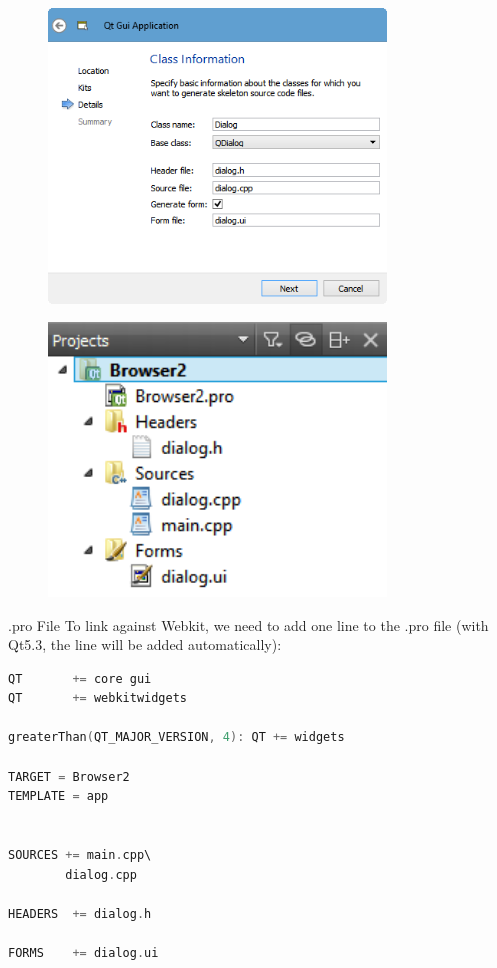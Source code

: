 \begin{figure}[htbp]
\centering
\includegraphics[width=0.8\textwidth]{images/QDialog.png}
\caption{}
\end{figure}

\begin{figure}[htbp]
\centering
\includegraphics[width=0.8\textwidth]{images/Browser2_Files.png}
\caption{}
\end{figure}

.pro File To link against Webkit, we need to add one line to the .pro
file (with Qt5.3, the line will be added automatically):

\begin{lstlisting}[language=c++, numbers=none]
QT       += core gui
QT       += webkitwidgets

greaterThan(QT_MAJOR_VERSION, 4): QT += widgets

TARGET = Browser2
TEMPLATE = app


SOURCES += main.cpp\
        dialog.cpp

HEADERS  += dialog.h

FORMS    += dialog.ui
\end{lstlisting}

